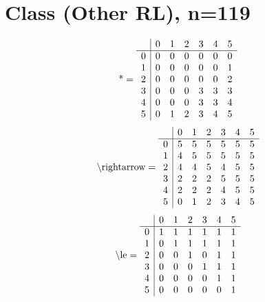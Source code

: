 \documentclass[11pt]{article}
\begin{document}
\section{Class (Other RL), n=119}
\[\text{*} = 
\begin{array}{r | r r r r r r}
 & 0 & 1 & 2 & 3 & 4 & 5 \\ \hline
0 & 0 & 0 & 0 & 0 & 0 & 0 \\
1 & 0 & 0 & 0 & 0 & 0 & 1 \\
2 & 0 & 0 & 0 & 0 & 0 & 2 \\
3 & 0 & 0 & 0 & 3 & 3 & 3 \\
4 & 0 & 0 & 0 & 3 & 3 & 4 \\
5 & 0 & 1 & 2 & 3 & 4 & 5 \\
\end{array}
\]
\[\text{\textbackslash rightarrow} = 
\begin{array}{r | r r r r r r}
 & 0 & 1 & 2 & 3 & 4 & 5 \\ \hline
0 & 5 & 5 & 5 & 5 & 5 & 5 \\
1 & 4 & 5 & 5 & 5 & 5 & 5 \\
2 & 4 & 4 & 5 & 4 & 5 & 5 \\
3 & 2 & 2 & 2 & 5 & 5 & 5 \\
4 & 2 & 2 & 2 & 4 & 5 & 5 \\
5 & 0 & 1 & 2 & 3 & 4 & 5 \\
\end{array}
\]
\[\text{\textbackslash le} = 
\begin{array}{r | r r r r r r}
 & 0 & 1 & 2 & 3 & 4 & 5 \\ \hline
0 & 1 & 1 & 1 & 1 & 1 & 1 \\
1 & 0 & 1 & 1 & 1 & 1 & 1 \\
2 & 0 & 0 & 1 & 0 & 1 & 1 \\
3 & 0 & 0 & 0 & 1 & 1 & 1 \\
4 & 0 & 0 & 0 & 0 & 1 & 1 \\
5 & 0 & 0 & 0 & 0 & 0 & 1 \\
\end{array}
\]
\end{document}
